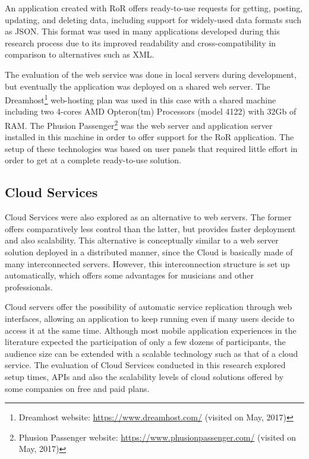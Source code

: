 An application created with RoR offers ready-to-use requests for getting, posting, updating, and deleting data, including support for widely-used data formats such as JSON.
This format was used in many applications developed during this research process due to its improved readability and cross-compatibility in comparison to alternatives such as XML.

The evaluation of the web service was done in local servers during development, but eventually the application was deployed on a shared web server.
The Dreamhost\footnote{Dreamhost website: \url{https://www.dreamhost.com/} (visited on May, 2017)} web-hosting plan was used in this case with a shared machine including two 4-cores AMD Opteron(tm) Processors (model 4122) with 32Gb of RAM. 
The Phusion Passenger\footnote{Phusion Passenger website: \url{https://www.phusionpassenger.com/} (visited on May, 2017)} was the web server and application server installed in this machine in order to offer support for the RoR application.
The setup of these technologies was based on user panels that required little effort in order to get at a complete ready-to-use solution.

\subsection*{Cloud Services}

Cloud Services were also explored as an alternative to web servers.
The former offers comparatively less control than the latter, but provides faster deployment and also scalability.
This alternative is conceptually similar to a web server solution deployed in a distributed manner, since the Cloud is basically made of many interconnected servers.
However, this interconnection structure is set up automatically, which offers some advantages for musicians and other professionals. 

Cloud servers offer the possibility of automatic service replication through web interfaces, allowing an application to keep running even if many users decide to access it at the same time.
Although most mobile application experiences in the literature expected the participation of only a few dozens of participants, the audience size can be extended with a scalable technology such as that of a cloud service.
The evaluation of Cloud Services conducted in this research explored setup times, APIs and also the scalability levels of cloud solutions offered by some companies on free and paid plans. 

